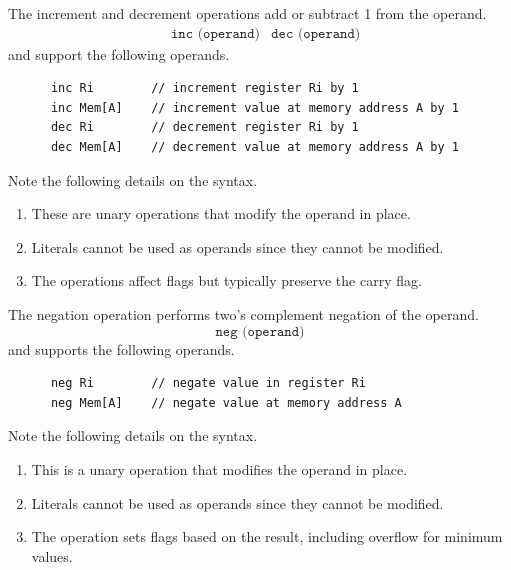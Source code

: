   \begin{definition}
    \label{def:increment-decrement}
    The increment and decrement operations add or subtract 1 from the operand.
    \begin{align*}
      & \texttt{inc (operand)} 
      & \texttt{dec (operand)}
    \end{align*}
    and support the following operands.
    \begin{lstlisting}
      inc Ri        // increment register Ri by 1
      inc Mem[A]    // increment value at memory address A by 1
      dec Ri        // decrement register Ri by 1
      dec Mem[A]    // decrement value at memory address A by 1
    \end{lstlisting}
    Note the following details on the syntax.
    \begin{enumerate}
      \item These are unary operations that modify the operand in place.
      \item Literals cannot be used as operands since they cannot be modified.
      \item The operations affect flags but typically preserve the carry flag.
    \end{enumerate}
  \end{definition}

  \begin{definition}[Negation]
    \label{def:negation}
    The negation operation performs two's complement negation of the operand.
    \begin{equation}
      \texttt{neg (operand)}
    \end{equation}
    and supports the following operands.
    \begin{lstlisting}
      neg Ri        // negate value in register Ri
      neg Mem[A]    // negate value at memory address A
    \end{lstlisting}
    Note the following details on the syntax.
    \begin{enumerate}
      \item This is a unary operation that modifies the operand in place.
      \item Literals cannot be used as operands since they cannot be modified.
      \item The operation sets flags based on the result, including overflow for minimum values.
    \end{enumerate}
  \end{definition}

